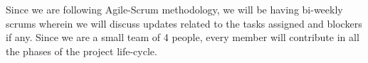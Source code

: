 \label{sec:task-distribution}
Since we are following Agile-Scrum methodology, we will be having bi-weekly scrums wherein we will discuss updates related to the tasks assigned and blockers if any. Since we are a small team of 4 people, every member will contribute in all the phases of the project life-cycle.